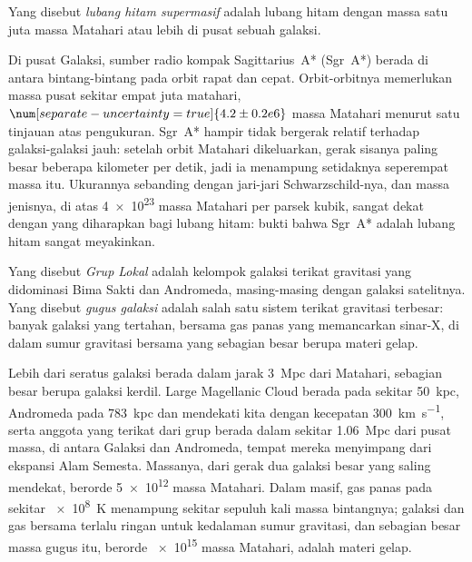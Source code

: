 \begin{definition}\label{def:b3:milky-way-galaxies:smbh}
Yang disebut \emph{lubang hitam supermasif} adalah lubang hitam
dengan massa satu juta massa Matahari atau lebih di pusat sebuah galaksi.
\end{definition}

Di pusat Galaksi, sumber radio kompak Sagittarius~A*
(Sgr~A*) berada di antara bintang-bintang pada orbit rapat dan cepat. Orbit-orbitnya memerlukan
massa pusat sekitar empat juta matahari, $\num[separate-uncertainty=true]{4.2 \pm 0.2 e6}$
massa Matahari menurut satu tinjauan atas pengukuran. Sgr~A* hampir tidak bergerak
relatif terhadap galaksi-galaksi jauh: setelah orbit Matahari dikeluarkan, gerak
sisanya paling besar beberapa kilometer per detik, jadi ia menampung
setidaknya seperempat massa itu. Ukurannya sebanding dengan jari-jari Schwarzschild-nya,
dan massa jenisnya, di atas \num{4e23} massa Matahari per
parsek kubik, sangat dekat dengan yang diharapkan bagi lubang hitam: bukti
bahwa Sgr~A* adalah lubang hitam sangat meyakinkan.

\begin{definition}\label{def:b3:milky-way-galaxies:groups}
Yang disebut \emph{Grup Lokal} adalah kelompok galaksi terikat gravitasi
yang didominasi Bima Sakti dan Andromeda, masing-masing dengan
galaksi satelitnya. Yang disebut \emph{gugus galaksi} adalah
salah satu sistem terikat gravitasi terbesar: banyak galaksi yang tertahan,
bersama gas panas yang memancarkan sinar-X, di dalam sumur gravitasi bersama yang
sebagian besar berupa materi gelap.
\end{definition}

Lebih dari seratus galaksi berada dalam jarak \qty{3}{Mpc} dari Matahari, sebagian besar
berupa galaksi kerdil. Large Magellanic Cloud berada pada sekitar \qty{50}{kpc}, Andromeda pada
\qty{783}{kpc} dan mendekati kita dengan kecepatan \qty{300}{km.s^{-1}}, serta anggota yang terikat
dari grup berada dalam sekitar \qty{1.06}{Mpc} dari pusat
massa, di antara Galaksi dan Andromeda, tempat mereka menyimpang dari
ekspansi Alam Semesta. Massanya, dari gerak dua galaksi besar
yang saling mendekat, berorde \num{5e12} massa Matahari. Dalam
 masif, gas panas pada sekitar \qty{e8}{K} menampung sekitar sepuluh
kali massa bintangnya; galaksi dan gas bersama terlalu ringan untuk
kedalaman sumur gravitasi, dan sebagian besar massa gugus itu,
berorde \num{e15} massa Matahari, adalah materi gelap.

